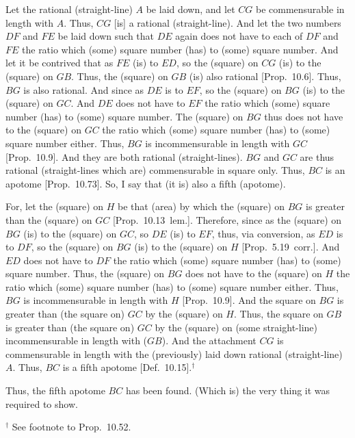 \begin{Parallel}{}{}
{Let the rational (straight-line) $A$ be laid down, and let
$CG$ be commensurable in length with $A$. Thus, $CG$ [is] a rational
(straight-line). And let the two numbers $DF$ and $FE$ be laid
down such that $DE$ again does not have to each of $DF$ and $FE$
the ratio which (some) square number (has) to (some) square number. 
And let it be contrived that as $FE$ (is) to $ED$, so the
(square) on $CG$ (is) to the (square) on $GB$. Thus, the (square) on
$GB$ (is) also rational [Prop.~10.6]. 
Thus, $BG$ is also rational.
And since as $DE$ is to $EF$, so the (square) on $BG$ (is) to
the (square) on $GC$. And $DE$ does not have to $EF$ the
ratio which (some) square number (has) to (some) square number.
The (square) on $BG$ thus does not have to the (square) on $GC$
the ratio which (some) square number (has) to (some) square number either.
Thus, $BG$ is incommensurable in length with $GC$ [Prop.~10.9]. And they are both rational (straight-lines). $BG$ and $GC$ are thus rational (straight-lines which are)
commensurable in square only. Thus, $BC$ is an apotome [Prop.~10.73]. So, I say that (it is) also a fifth
(apotome).

For, let the (square) on $H$ be that (area) by which the (square) on $BG$
is greater than the (square) on $GC$ [Prop.~10.13~lem.]. Therefore, since
as the (square) on $BG$ (is) to the (square) on $GC$, so $DE$  (is) to
$EF$, thus, via conversion, as $ED$ is to $DF$, so the (square)
on $BG$ (is) to the (square) on $H$ [Prop.~5.19~corr.]. And $ED$ does not have to
$DF$ the ratio which (some) square number (has) to (some) square number.
Thus, the (square) on $BG$ does not have to the (square) on $H$
the ratio which (some) square number (has) to (some) square number
either. Thus, $BG$ is incommensurable in length with $H$ [Prop.~10.9]. And the square on $BG$ is greater
than (the square on) $GC$ by the (square) on $H$.
Thus, the square on $GB$ is greater
than (the square on) $GC$ by the (square) on (some straight-line)
incommensurable in length with ($GB$). And the attachment $CG$ is
commensurable in length with the (previously) laid down rational (straight-line) $A$. Thus, $BC$ is a fifth apotome [Def.~10.15].$^\dag$

Thus, the fifth apotome $BC$ has been found. (Which is) the very thing it
was required to show.}
\end{Parallel}
{\footnotesize\noindent$^\dag$ See footnote to Prop.~10.52.}

